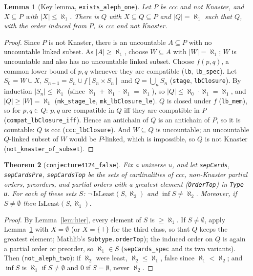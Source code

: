 \documentclass[11pt]{article}
\newtheorem{theorem}{Theorem}
\newtheorem{lemma}[theorem]{Lemma}
\theoremstyle{definition}
\begin{document}
\begin{lemma}[Key lemma, \texttt{exists\_aleph\_one}]\label{lem:key}
Let $P$ be ccc and not Knaster, and $X\subseteq P$ with $|X|\le\aleph_1$. There is $Q$ with
$X\subseteq Q\subseteq P$ and $|Q|=\aleph_1$ such that $Q$, with the order induced from $P$, is
ccc and not Knaster.
\end{lemma}
\begin{proof}
Since $P$ is not Knaster, there is an uncountable $A\subseteq P$ with no uncountable linked subset.
As $|A|\ge\aleph_1$, choose $W\subseteq A$ with $|W|=\aleph_1$; $W$ is uncountable and also has no
uncountable linked subset. Choose $f(p,q)$, a common lower bound of $p,q$ whenever they are
compatible (\texttt{lb}, \texttt{lb\_spec}). Let $S_0=W\cup X$, $S_{n+1}=S_n\cup f[S_n\times S_n]$
and $Q=\bigcup_n S_n$ (\texttt{stage}, \texttt{lbClosure}). By induction $|S_n|\le\aleph_1$
(since $\aleph_1+\aleph_1\cdot\aleph_1=\aleph_1$), so $|Q|\le\aleph_0\cdot\aleph_1=\aleph_1$, and
$|Q|\ge|W|=\aleph_1$ (\texttt{mk\_stage\_le}, \texttt{mk\_lbClosure\_le}). $Q$ is closed under $f$
(\texttt{lb\_mem}), so for $p,q\in Q$: $p,q$ are compatible in $Q$ iff they are compatible in $P$
(\texttt{compat\_lbClosure\_iff}). Hence an antichain of $Q$ is an antichain of $P$, so it is
countable: $Q$ is ccc (\texttt{ccc\_lbClosure}). And $W\subseteq Q$ is uncountable; an uncountable
$Q$-linked subset of $W$ would be $P$-linked, which is impossible, so $Q$ is not Knaster
(\texttt{not\_knaster\_of\_subset}).
\end{proof}

\begin{theorem}[\texttt{conjecture4124\_false}]
Fix a universe $u$, and let \texttt{sepCards}, \texttt{sepCardsPre}, \texttt{sepCardsTop} be the
sets of cardinalities of ccc, non-Knaster partial orders, preorders, and partial orders with a
greatest element (\texttt{OrderTop}) in \texttt{Type u}. For each of these sets $S$:
$\neg\,\mathrm{IsLeast}(S,\aleph_2)$ and $\inf S\neq\aleph_2$. Moreover, if $S\neq\emptyset$ then
$\mathrm{IsLeast}(S,\aleph_1)$.
\end{theorem}
\begin{proof}
By Lemma~\ref{lem:hier}, every element of $S$ is $\ge\aleph_1$. If $S\ne\emptyset$, apply
Lemma~\ref{lem:key} with $X=\emptyset$ (or $X=\{\top\}$ for the third class, so that $Q$ keeps
the greatest element; Mathlib's \texttt{Subtype.orderTop}); the induced order on $Q$ is again a
partial order or preorder, so $\aleph_1\in S$ (\texttt{sepCards\_spec} and its two variants).
Then (\texttt{not\_aleph\_two}): if $\aleph_2$ were least, $\aleph_2\le\aleph_1$, false since
$\aleph_1<\aleph_2$; and $\inf S$ is $\aleph_1$ if $S\ne\emptyset$ and $0$ if $S=\emptyset$, never
$\aleph_2$.
\end{proof}
\end{document}
